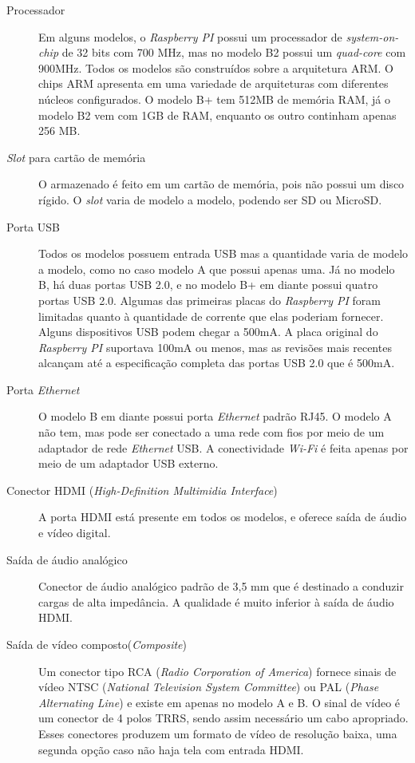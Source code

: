 \documentclass[
	12pt,				%
	openright,			%
	twoside,			%
	a4paper,			%
	chapter=TITLE,		%
	english,			%
	brazil				%
	]{abntex2}
\begin{document}
\begin{description}

\item[Processador]
Em alguns modelos, o \textit{Raspberry PI} possui um processador de \textit{system-on-chip} de 32 bits com 700 MHz, mas no modelo B2 possui um \textit{quad-core} com 900MHz. Todos os modelos são construídos sobre a arquitetura ARM. O chips ARM apresenta em uma variedade de arquiteturas com diferentes núcleos configurados. O modelo B+ tem 512MB de memória RAM, já o modelo B2 vem com 1GB de RAM, enquanto os outro continham apenas 256 MB.
 
\item[\textit{Slot} para cartão de memória]
O armazenado é feito em um cartão de memória, pois não possui um disco rígido. O \textit{slot} varia de modelo a modelo, podendo ser SD ou MicroSD.

\item[Porta USB]
Todos os modelos possuem entrada USB mas a quantidade varia de modelo a modelo, como no caso modelo A que possui apenas uma. Já no modelo B, há duas portas USB 2.0, e no modelo B+ em diante possui quatro portas USB 2.0. Algumas das primeiras placas do \textit{Raspberry PI} foram limitadas quanto à quantidade de corrente que elas poderiam fornecer. Alguns dispositivos USB podem chegar a 500mA. A placa original do \textit{Raspberry PI} suportava 100mA ou menos, mas as revisões mais recentes alcançam até a especificação completa das portas USB 2.0 que é 500mA.

\item[Porta \textit{Ethernet}] 
O modelo B em diante possui porta \textit{Ethernet} padrão RJ45. O modelo A não tem, mas pode ser conectado a uma rede com fios por meio de um adaptador de rede \textit{Ethernet} USB. A conectividade \textit{Wi-Fi} é feita apenas por meio de um adaptador USB externo.

\item[Conector HDMI (\textit{High-Definition Multimidia Interface})] 
A porta HDMI está presente em todos os modelos, e oferece saída de áudio e vídeo digital.

\item[Saída de áudio analógico]
Conector de áudio analógico padrão de 3,5 mm que é destinado a conduzir cargas de alta impedância. A qualidade é muito inferior à saída de áudio HDMI.

\item[Saída de vídeo composto(\textit{Composite})]
Um conector tipo RCA (\textit{Radio Corporation of America}) fornece sinais de vídeo NTSC (\textit{National Television System Committee}) ou PAL (\textit{Phase Alternating Line}) e existe em apenas no modelo A e B. O sinal de vídeo é um conector de 4 polos TRRS, sendo assim necessário um cabo apropriado. Esses conectores produzem um formato de vídeo de resolução baixa, uma segunda opção caso não haja tela com entrada HDMI.


\end{description}
\end{document}
